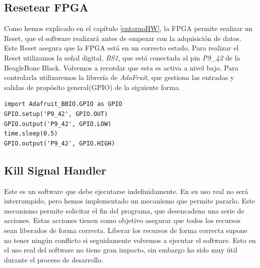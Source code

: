 	\subsection{Resetear FPGA}
		Como hemos explicado en el capítulo \ref{entornoHW}, la FPGA permite realizar un Reset, que el software realizará antes de empezar con
		la adquisición de datos. Este Reset asegura que la FPGA está en un correcto estado. Para realizar el Reset utilizamos la señal
		digital, \emph{BS1}, que está conectada al pin \emph{P9\_42} de la BeagleBone Black. Volvemos a recordar que esta es activa a nivel
		bajo. Para controlarla utilizaremos la librería de \emph{AdaFruit}\cite{AdaFruitGit}, que gestiona las entradas y salidas de propósito
		general(GPIO) de la siguiente forma.
		\begin{lstlisting}[style=myPython]
import Adafruit_BBIO.GPIO as GPIO
GPIO.setup('P9_42', GPIO.OUT)
GPIO.output('P9_42', GPIO.LOW)
time.sleep(0.5)
GPIO.output('P9_42', GPIO.HIGH)
		\end{lstlisting}
	
	\subsection{Kill Signal Handler}
		Este es un software que debe ejecutarse indefinidamente. En su uso real no será interrumpido, pero hemos implementado un mecanismo que
		permite pararlo. Este mecanismo permite solicitar el fin del programa, que desencadena una serie de acciones. Estas acciones tienen
		como objetivo asegurar que todos los recursos sean liberados de forma correcta. Liberar los recursos de forma correcta supone no tener
		ningún conflicto si seguidamente volvemos a ejecutar el software. Esto en el uso real del software no tiene gran impacto, sin embargo
		ha sido muy útil durante el proceso de desarrollo.

